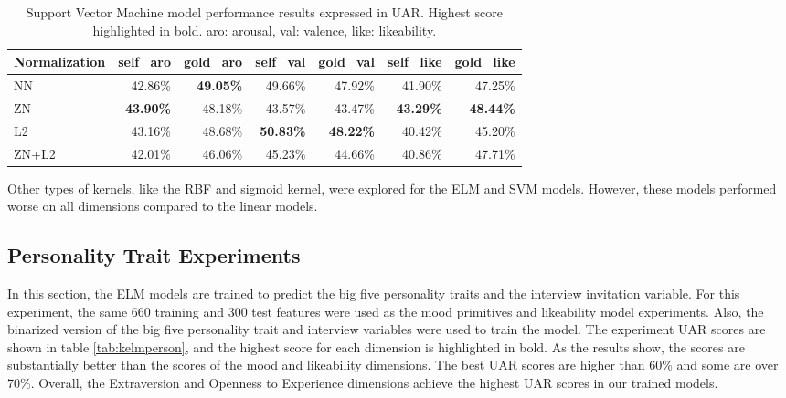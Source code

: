 \begin{table*}[h]
\begin{tabular}{|l|r|r|r|r|r|r|}
\hline
\rowcolor{Gray}
Normalization & \multicolumn{1}{l|}{self\_aro} & \multicolumn{1}{l|}{gold\_aro} & \multicolumn{1}{l|}{self\_val} & \multicolumn{1}{l|}{gold\_val} & \multicolumn{1}{l|}{self\_like} & \multicolumn{1}{l|}{gold\_like} \\ \hline
NN & 42.86\% & \textbf{49.05\%} & 49.66\% & 47.92\% & 41.90\% & 47.25\% \\ \hline
ZN & \textbf{43.90\%} & 48.18\% & 43.57\% & 43.47\% & \textbf{43.29\%} & \textbf{48.44\%} \\ \hline
L2 & 43.16\% & 48.68\% & \textbf{50.83\%} & \textbf{48.22\%} & 40.42\% & 45.20\% \\ \hline
ZN+L2 & 42.01\% & 46.06\% & 45.23\% & 44.66\% & 40.86\% & 47.71\% \\ \hline
\end{tabular}
\caption{Support Vector Machine model performance results expressed in UAR. Highest score highlighted in bold. aro: arousal, val: valence, like: likeability.}
\label{tab:svm}
\end{table*}

Other types of kernels, like the RBF and sigmoid kernel, were explored for the ELM and SVM models. However, these models performed worse on all dimensions compared to the linear models. 

\subsection{Personality Trait Experiments}\label{subsection:personexp}

In this section, the ELM models are trained to predict the big five personality traits and the interview invitation variable. For this experiment, the same 660 training and 300 test features were used as the mood primitives and likeability model experiments. Also, the binarized version of the big five personality trait and interview variables were used to train the model. The experiment UAR scores are shown in table \ref{tab:kelmperson}, and the highest score for each dimension is highlighted in bold. As the results show, the scores are substantially better than the scores of the mood and likeability dimensions. The best UAR scores are higher than 60\% and some are over 70\%. Overall, the Extraversion and Openness to Experience dimensions achieve the highest UAR scores in our trained models. 

